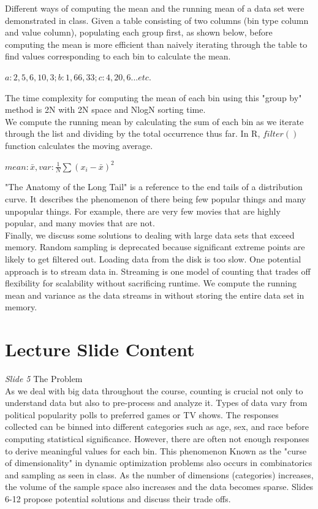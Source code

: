 Different ways of computing the mean and the running mean of a data set were demonstrated in class. Given a table consisting of two columns (bin type column and value column), populating each group first, as shown below, before computing the mean is more efficient than naively iterating through the table to find values corresponding to each bin to calculate the mean. \\
\begin{center}$a: 2, 5, 6, 10, 3; b: 1, 66, 33; c: 4, 20, 6... etc.$\end{center}
The time complexity for computing the mean of each bin using this "group by" method is 2N with 2N space and NlogN sorting time. \\

\indent We compute the running mean by calculating the sum of each bin as we iterate through the list and dividing by the total occurrence thus far. In R, $filter()$ function calculates the moving average. \\
\begin{center}$mean: \bar{x}, var: \frac{1}{N} \sum (x_{i}-\bar{x})^2$\end{center}

\indent "The Anatomy of the Long Tail" is a reference to the end tails of a distribution curve. It describes the phenomenon of there being few popular things and many unpopular things. For example, there are very few movies that are highly popular, and many movies that are not.\\

\indent Finally, we discuss some solutions to dealing with large data sets that exceed memory. Random sampling is deprecated because significant extreme points are likely to get filtered out. Loading data from the disk is too slow. One potential approach is to stream data in. Streaming is one model of counting that trades off flexibility for scalability without sacrificing runtime. We compute the running mean and variance as the data streams in without storing the entire data set in memory. \\

\section{Lecture Slide Content}
{\it Slide 5} The Problem\\
\indent As we deal with big data throughout the course, counting is crucial not only to understand data but also to pre-process and analyze it. Types of data vary from political popularity polls to preferred games or TV shows. The responses collected can be binned into different categories such as age, sex, and race before computing statistical significance. However, there are often not enough responses to derive meaningful values for each bin. This phenomenon Known as the "curse of dimensionality" in dynamic optimization problems also occurs in combinatorics and sampling as seen in class. As the number of dimensions (categories) increases, the volume of the sample space also increases and the data becomes sparse. Slides 6-12 propose potential solutions and discuss their trade offs. \\


